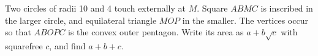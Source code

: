 Two circles of radii 10 and 4 touch externally at $M$. Square $ABMC$ is inscribed in the larger circle, and equilateral triangle $MOP$ in the smaller. The vertices occur so that $ABOPC$ is the convex outer pentagon. Write its area as $a+b\sqrt c$ with squarefree $c$, and find $a+b+c$.
